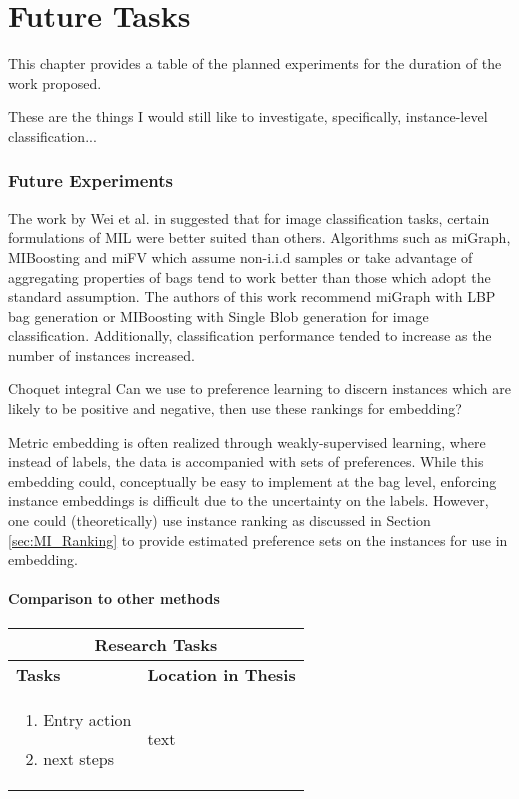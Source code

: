 \chapter{Future Tasks}
This chapter provides a table of the planned experiments for the duration of the work proposed.

These are the things I would still like to investigate, specifically, instance-level classification...

\subsection{Future Experiments}

The work by Wei et al. in \cite{Wei2016ImageBagGenerators} suggested that  for image classification tasks, certain formulations of MIL were better suited than others.  Algorithms such as miGraph, MIBoosting and miFV which assume non-i.i.d samples or take advantage of aggregating properties of bags tend to work better than those which adopt the standard assumption.  The authors of this work recommend miGraph with LBP bag generation or MIBoosting with Single Blob generation for image classification.  Additionally, classification performance tended to increase as the number of instances increased.

Choquet integral
Can we use to preference learning to discern instances which are likely to be positive and negative, then use these rankings for embedding?

Metric embedding is often realized through weakly-supervised learning, where instead of labels, the data is accompanied with sets of preferences. While this embedding could, conceptually be easy to implement at the bag level, enforcing instance embeddings is difficult due to the uncertainty on the labels.  However, one could (theoretically) use instance ranking as discussed in Section \ref{sec:MI_Ranking} to provide estimated preference sets on the instances for use in embedding.

\subsubsection{Comparison to other methods}

\begin{table}[H]
	\caption[List of Research Tasks]{List of research tasks and their corresponding locations in the dissertation document.}
	\label{tab:future_tasks}
	\begin{longtable}{ |p{8cm}|p{6cm}|  } 
		\hline
		\multicolumn{2}{|c|}{\textbf{Research Tasks}} \\
		\hline
		\hline
		\textbf{Tasks} & \textbf{Location in Thesis} \\
		\hline
		\begin{enumerate}
			\item Entry action
			\item next steps
		\end{enumerate} & text\\
		\hline
	\end{longtable}
\end{table}
